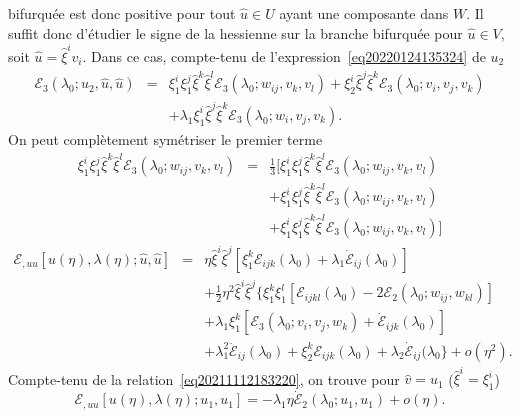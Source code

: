 \documentclass[12pt, final]{amsart}
\begin{document}
bifurquée est donc positive pour tout $\hat{u} \in U$ ayant une composante
dans $W$. Il suffit donc d'étudier le signe de la hessienne sur la branche
bifurquée pour $\hat{u} \in V$, soit $\hat{u} = \hat{\xi}^i v_i$. Dans ce
cas, compte-tenu de l'expression~\eqref{eq20220124135324} de $u_2$
\begin{eqnarray}
  \mathcal{E}_3 (\lambda_0 ; u_2, \hat{u}, \hat{u}) & = & \xi_1^i \xi_1^j
  \hat{\xi}^k  \hat{\xi}^l \mathcal{E}_3 (\lambda_0 ; w_{i  j}, v_k,
  v_l) + \xi_2^i  \hat{\xi}^j  \hat{\xi}^k \mathcal{E}_3 (\lambda_0 ; v_i,
  v_j, v_k) \nonumber\\
  &  & + \lambda_1 \xi_1^i  \hat{\xi}^j  \hat{\xi}^k \mathcal{E}_3 (\lambda_0
  ; w_i, v_j, v_k) .
\end{eqnarray}
On peut compl{\`e}tement symétriser le premier terme
\begin{eqnarray}
  \xi_1^i \xi_1^j  \hat{\xi}^k  \hat{\xi}^l \mathcal{E}_3 (\lambda_0 ; w_{i
   j}, v_k, v_l) & = & \tfrac{1}{3} [\xi_1^i \xi_1^j  \hat{\xi}^k
  \hat{\xi}^l \mathcal{E}_3 (\lambda_0 ; w_{i  j}, v_k, v_l)
   \nonumber\\
  &  & + \xi_1^i \xi_1^j  \hat{\xi}^k  \hat{\xi}^l \mathcal{E}_3 (\lambda_0 ;
  w_{i  j}, v_k, v_l) \nonumber\\
  &  &  + \xi_1^i \xi_1^j  \hat{\xi}^k  \hat{\xi}^l \mathcal{E}_3
  (\lambda_0 ; w_{i  j}, v_k, v_l)]
\end{eqnarray}
\begin{eqnarray}
  \mathcal{E}_{, u  u} [u (\eta), \lambda (\eta) ; \hat{u}, \hat{u}] &
  = & \eta \hat{\xi}^i  \hat{\xi}^j  [\xi_1^k \mathcal{E}_{i  j
   k} (\lambda_0) + \lambda_1  \dot{\mathcal{E}}_{i  j}
  (\lambda_0)] \nonumber\\
  &  & + \tfrac{1}{2} \eta^2 \hat{\xi}^i
  \hat{\xi}^j  \{ \xi_1^k \xi_1^l  [\mathcal{E}_{i  j  k
   l} (\lambda_0) - 2\mathcal{E}_2 (\lambda_0 ; w_{i  j}, w_{k
   l})]  \nonumber\\
  &  & + \lambda_1 \xi_1^k  [\mathcal{E}_3 (\lambda_0 ; v_i, v_j, w_k) +
  \dot{\mathcal{E}}_{i  j  k} (\lambda_0)] \nonumber\\
  &  & + \lambda_1^2  \ddot{\mathcal{E}}_{i  j} (\lambda_0) + \xi_2^k
  \mathcal{E}_{i  j  k} (\lambda_0) + \lambda_2
  \dot{\mathcal{E}}_{i  j} (\lambda_0 \} + o (\eta^2) .
  \label{eq20220203144500}
\end{eqnarray}
Compte-tenu de la relation~\eqref{eq20211112183220}, on trouve pour $\hat{v} =
u_1$ ($\hat{\xi}^i = \xi_1^i$)
\begin{equation}
  \mathcal{E}_{, u  u} [u (\eta), \lambda (\eta) ; u_1, u_1] = -
  \lambda_1 \eta \dot{\mathcal{E}}_2 (\lambda_0 ; u_1, u_1) + o (\eta) .
\end{equation}
\end{document}
